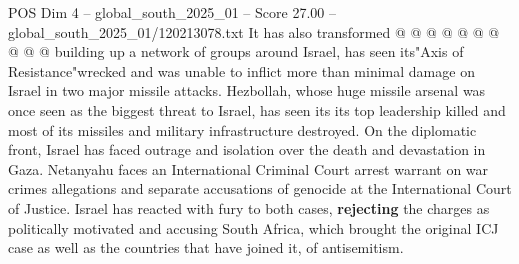 \begin{textsample}{POS Dim 4 – global\_south\_2025\_01 – Score 27.00 – global\_south\_2025\_01/120213078.txt}
It has also transformed @ @ @ @ @ @ @ @ @ @ building up a network of groups around Israel, has seen its"Axis of Resistance"wrecked and was unable to inflict more than minimal damage on Israel in two major missile attacks.
Hezbollah, whose huge missile arsenal was once seen as the biggest threat to Israel, has seen its its top leadership killed and most of its missiles and military infrastructure destroyed.
On the diplomatic front, Israel has faced outrage and isolation over the death and devastation in Gaza.
Netanyahu faces an International Criminal Court arrest warrant on war crimes allegations and separate accusations of genocide at the International Court of Justice.
Israel has reacted with fury to both cases, \textbf{rejecting} the charges as politically motivated and accusing South Africa, which brought the original ICJ case as well as the countries that have joined it, of antisemitism.

\end{textsample}
